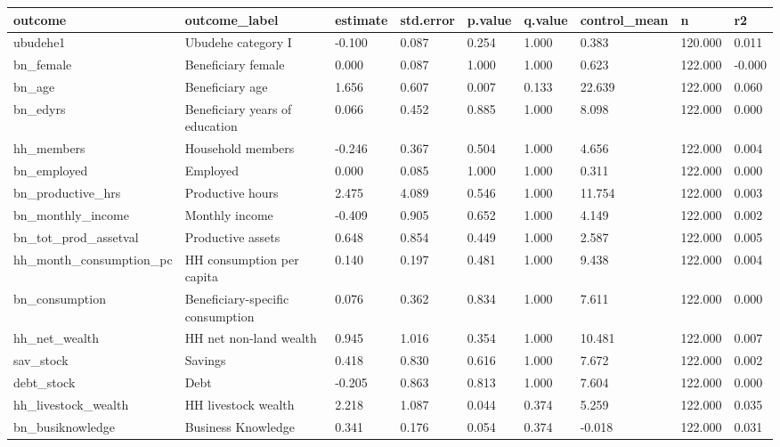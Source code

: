 \begin{tabular}{lllllllll}
\toprule
outcome & outcome\_label & estimate & std.error & p.value & q.value & control\_mean & n & r2
 \\
\midrule
ubudehe1 & Ubudehe category I & -0.100 & 0.087 & 0.254 & 1.000 & 0.383 & 120.000 & 0.011 \\
bn\_female & Beneficiary female & 0.000 & 0.087 & 1.000 & 1.000 & 0.623 & 122.000 & -0.000 \\
bn\_age & Beneficiary age & 1.656 & 0.607 & 0.007 & 0.133 & 22.639 & 122.000 & 0.060 \\
bn\_edyrs & Beneficiary years of education & 0.066 & 0.452 & 0.885 & 1.000 & 8.098 & 122.000 & 0.000 \\
hh\_members & Household members & -0.246 & 0.367 & 0.504 & 1.000 & 4.656 & 122.000 & 0.004 \\
bn\_employed & Employed & 0.000 & 0.085 & 1.000 & 1.000 & 0.311 & 122.000 & 0.000 \\
bn\_productive\_hrs & Productive hours & 2.475 & 4.089 & 0.546 & 1.000 & 11.754 & 122.000 & 0.003 \\
bn\_monthly\_income & Monthly income & -0.409 & 0.905 & 0.652 & 1.000 & 4.149 & 122.000 & 0.002 \\
bn\_tot\_prod\_assetval & Productive assets & 0.648 & 0.854 & 0.449 & 1.000 & 2.587 & 122.000 & 0.005 \\
hh\_month\_consumption\_pc & HH consumption per capita & 0.140 & 0.197 & 0.481 & 1.000 & 9.438 & 122.000 & 0.004 \\
bn\_consumption & Beneficiary-specific consumption & 0.076 & 0.362 & 0.834 & 1.000 & 7.611 & 122.000 & 0.000 \\
hh\_net\_wealth & HH net non-land wealth & 0.945 & 1.016 & 0.354 & 1.000 & 10.481 & 122.000 & 0.007 \\
sav\_stock & Savings & 0.418 & 0.830 & 0.616 & 1.000 & 7.672 & 122.000 & 0.002 \\
debt\_stock & Debt & -0.205 & 0.863 & 0.813 & 1.000 & 7.604 & 122.000 & 0.000 \\
hh\_livestock\_wealth & HH livestock wealth & 2.218 & 1.087 & 0.044 & 0.374 & 5.259 & 122.000 & 0.035 \\
bn\_busiknowledge & Business Knowledge & 0.341 & 0.176 & 0.054 & 0.374 & -0.018 & 122.000 & 0.031 \\
\bottomrule
\end{tabular}
